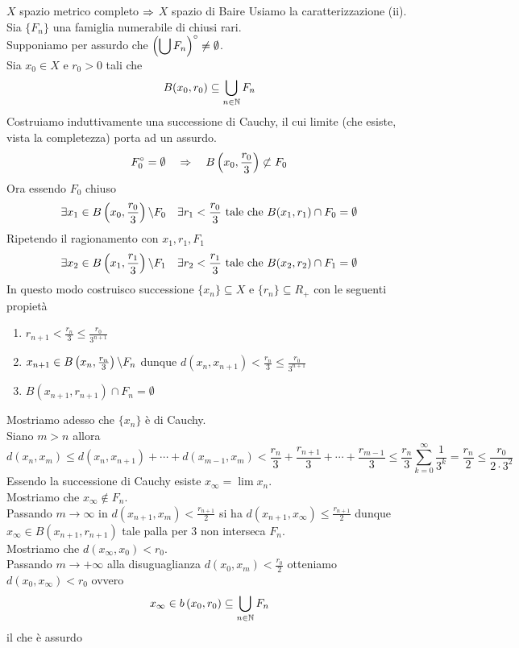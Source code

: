 \begin{thm}$X$ spazio metrico completo $\Rightarrow$ $X$ spazio di Baire
\proof Usiamo la caratterizzazione  (ii).\\
Sia $\{F_n\} $ una famiglia numerabile di chiusi rari.\\
Supponiamo per assurdo che $\displaystyle \left( \bigcup F_n \right)^\circ\neq \emptyset$.\\
Sia $x_0\in X$ e $r_0>0$ tali che 
$$ B(x_0,r_0)\subseteq \bigcup_{n \in \mathbb{N}} F_n$$
Costruiamo induttivamente una successione di Cauchy, il cui limite (che esiste, vista la completezza) porta ad un assurdo.\\
$$F_0^\circ = \emptyset \quad \Rightarrow \quad B\left( x_0, \frac{r_0}{3} \right) \not \subset F_0$$
Ora essendo $F_0$ chiuso 
$$ \exists x_1 \in B\left( x_0, \frac{r_0}{3}\right) \backslash F_0 \quad \exists r_1<\frac{r_0}{3} \text{ tale che } B(x_1, r_1) \cap F_0 = \emptyset$$
Ripetendo il ragionamento con $x_1, r_1, F_1$ 
$$ \exists x_2 \in B\left( x_1, \frac{r_1}{3} \right)\backslash F_1 \quad \exists r_2 < \frac{r_1}{3} \text{ tale che } B(x_2,r_2) \cap F_1 = \emptyset$$
In questo modo costruisco  successione $\{ x_n \}\subseteq X $ e $\{ r_n\}\subseteq R_+$ con le seguenti propiet\`a
\begin{enumerate}
\item $r_{n+1}< \frac{r_n}{3}\leq \frac{r_0}{3^{n+1}}$
\item $x_{n+1}\in B\left( x_n, \frac{r_n}{3} \right)\backslash F_n$ dunque $d(x_n, x_{n+1})< \frac{r_n}{3} \leq \frac{r_0}{3^{n+1}}$
\item $B(x_{n+1}, r_{n+1}) \cap F_n = \emptyset$
\end{enumerate}
Mostriamo adesso che $\{ x_n\}$ \`e di Cauchy.\\
Siano $m>n$ allora 
$$ d(x_n,x_m) \leq d\left( x_n, x_{n+1} \right)+ \cdots + d\left( x_{m-1},x_m \right)< \frac{r_n}{3}+ \frac{r_{n+1}}{3} + \cdots + \frac{r_{m-1}}{3} \leq \frac{r_n}{3}\sum_{k=0}^\infty \frac{1}{3^k}=\frac{r_n}{2}\leq \frac{r_0}{2\cdot 3^2}$$
Essendo la successione di Cauchy esiste $x_\infty=\lim x_n$.\\
Mostriamo che $x_\infty\not \in F_n$.\\
Passando $m\to \infty	$ in $d\left( x_{n+1},x_m \right)<\frac{r_{n+1}}{2}$
 si ha $d\left( x_{n+1}, x_\infty \right)\leq \frac{r_{n+1}}{2}$ dunque $x_\infty \in B\left( x_{n+1}, r_{n+1} \right)$ tale palla per 3 non interseca $F_n$.\\
 Mostriamo che $d\left( x_\infty, x_0 \right)<r_0$.\\
 Passando $m \to + \infty$ alla disuguaglianza $d\left( x_0, x_m \right)< \frac{r_0}{2}$ otteniamo $d(x_0, x_\infty) < r_0$ ovvero 
$$ x_\infty \in b\left( x_0, r_0 \right)\subseteq \bigcup_{n \in \mathbb{N}} F_n$$ il che \`e assurdo 
\endproof
\end{thm}
